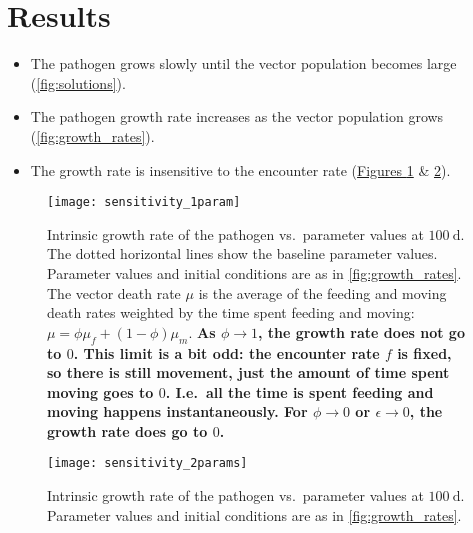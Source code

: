 \documentclass{article}
\newcommand{\comment}[1]{\textbf{#1}}
\begin{document}
\section{Results}

\begin{itemize}
\item The pathogen grows slowly until the vector population becomes
  large (\autoref{fig:solutions}).

\item The pathogen growth rate increases as the vector population
  grows (\autoref{fig:growth_rates}).

\item The growth rate is insensitive to the encounter rate
  (\hyperref[fig:sensitivity_1param]{Figures
    \ref*{fig:sensitivity_1param}} \& \ref{fig:sensitivity_2params}).
\end{itemize}


\begin{figure}
  \centering
  \texttt{[image: sensitivity\_1param]}
  \caption{Intrinsic growth rate of the pathogen vs.~parameter values
    at $100~\text{d}$.  The dotted horizontal lines show the baseline
    parameter values.  Parameter values and initial conditions are as
    in \autoref{fig:growth_rates}.  The vector death rate $\mu$ is the
    average of the feeding and moving death rates weighted by the time
    spent feeding and moving: $\mu = \phi \mu_f + (1 - \phi) \mu_m$.
    \comment{As $\phi \to 1$, the
      growth rate does not go to $0$.  This limit is a bit odd: the
      encounter rate $f$ is fixed, so there is still movement, just
      the amount of time spent moving goes to $0$.  I.e.~all the time
      is spent feeding and moving happens instantaneously.  For
      $\phi \to 0$ or $\epsilon \to 0$, the growth rate does go to
      $0$.}}
  \label{fig:sensitivity_1param}
\end{figure}

\begin{figure}
  \centering
  \texttt{[image: sensitivity\_2params]}
  \caption{Intrinsic growth rate of the pathogen vs.~parameter values
    at $100~\text{d}$.  Parameter values and initial conditions are as
    in \autoref{fig:growth_rates}.}
  \label{fig:sensitivity_2params}
\end{figure}


\clearpage
\appendix
\renewcommand{\thefigure}{A\arabic{figure}}
\renewcommand{\theHfigure}{\thefigure}
\setcounter{figure}{0}
\end{document}
